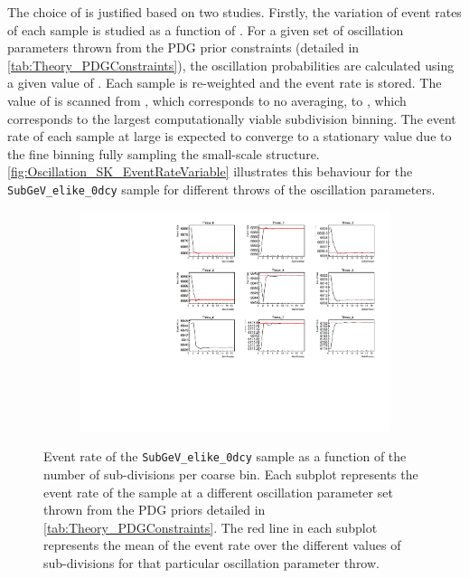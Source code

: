 
The choice of  is justified based on two studies. Firstly, the variation of event rates of each sample is studied as a function of . For a given set of oscillation parameters thrown from the PDG prior constraints (detailed in \autoref{tab:Theory_PDGConstraints}), the oscillation probabilities are calculated using a given value of . Each sample is re-weighted and the event rate is stored. The value of  is scanned from , which corresponds to no averaging, to , which corresponds to the largest computationally viable subdivision binning. The event rate of each sample at large  is expected to converge to a stationary value due to the fine binning fully sampling the small-scale structure. \autoref{fig:Oscillation_SK_EventRateVariable} illustrates this behaviour for the \texttt{SubGeV\_elike\_0dcy} sample for  different throws of the oscillation parameters.

\begin{figure}[h]
  \begin{subfigure}[t]{\textwidth}
    \includegraphics[width=\textwidth, trim={0mm 0mm 0mm 0mm}, clip,page=1]{Figures/Oscillation/EventRate_VariableGraphs.pdf}
  \end{subfigure}
  \caption{Event rate of the \texttt{SubGeV\_elike\_0dcy} sample as a function of the number of sub-divisions per coarse bin. Each subplot represents the event rate of the sample at a different oscillation parameter set thrown from the PDG priors detailed in \autoref{tab:Theory_PDGConstraints}. The red line in each subplot represents the mean of the event rate over the different values of sub-divisions for that particular oscillation parameter throw.}
  \label{fig:Oscillation_SK_EventRateVariable}
\end{figure}

